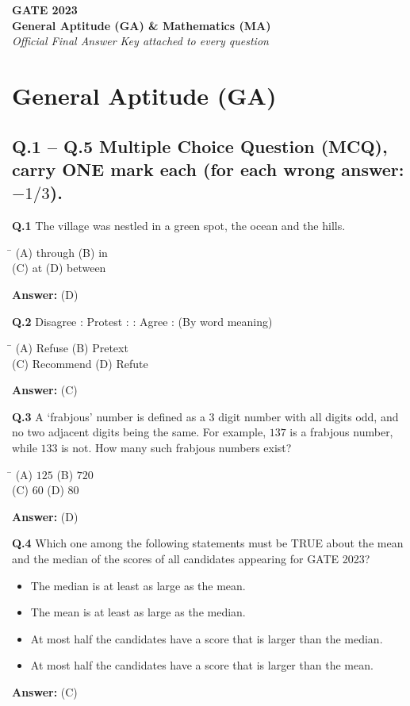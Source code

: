 \documentclass[11pt,a4paper]{article}
\newcommand{\optsfourA}[4]{%
  \begin{tabbing}
    \hspace{0.48\linewidth}\=\kill
    (A) #1 \> (B) #2 \\[2pt]
    (C) #3 \> (D) #4
  \end{tabbing}%
}
\newcommand{\optslistA}[4]{%
  \begin{itemize}
    \setlength{\itemsep}{2pt}\setlength{\parskip}{0pt}
    \item[(A)] #1
    \item[(B)] #2
    \item[(C)] #3
    \item[(D)] #4
  \end{itemize}%
}
\newcommand{\ans}[1]{\textbf{Answer:} #1\par\medskip}
\begin{document}

\begin{center}
  {\LARGE\bfseries GATE 2023}\\[4pt]
  {\large\bfseries General Aptitude (GA) \& Mathematics (MA)}\\[2pt]
  {\small\itshape Official Final Answer Key attached to every question}
\end{center}
\medskip

\section*{General Aptitude (GA)}

\subsection*{Q.1 -- Q.5 Multiple Choice Question (MCQ), carry ONE mark each (for each wrong answer: $-1/3$).}

\textbf{Q.1} The village was nestled in a green spot, \underline{\hspace{2cm}} the ocean and the hills.
\optsfourA{through}{in}{at}{between}
\ans{(D)}

\textbf{Q.2} Disagree : Protest : : Agree : \underline{\hspace{2cm}} (By word meaning)
\optsfourA{Refuse}{Pretext}{Recommend}{Refute}
\ans{(C)}

\textbf{Q.3} A `frabjous' number is defined as a 3 digit number with all digits odd, and no two adjacent digits being the same. For example, $137$ is a frabjous number, while $133$ is not. How many such frabjous numbers exist?
\optsfourA{$125$}{$720$}{$60$}{$80$}
\ans{(D)}

\textbf{Q.4} Which one among the following statements must be TRUE about the mean and the median of the scores of all candidates appearing for GATE 2023?
\optslistA{The median is at least as large as the mean.}{The mean is at least as large as the median.}{At most half the candidates have a score that is larger than the median.}{At most half the candidates have a score that is larger than the mean.}
\ans{(C)}
\end{document}

